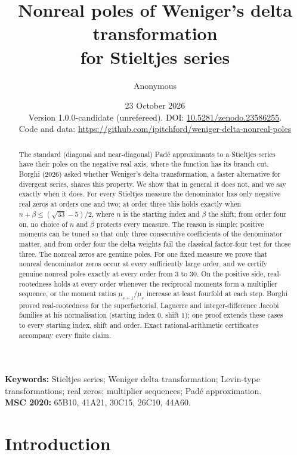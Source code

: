 \documentclass[11pt,a4paper]{article}
\title{Nonreal poles of Weniger's delta transformation\\ for Stieltjes series}
\author{Anonymous}
\date{23 October 2026\\[2pt]\small Version 1.0.0-candidate (unrefereed). DOI: \href{https://doi.org/10.5281/zenodo.23586255}{10.5281/zenodo.23586255}.\\
\small Code and data: \url{https://github.com/ipitchford/weniger-delta-nonreal-poles}}
\theoremstyle{definition}
\theoremstyle{remark}
\begin{document}
\maketitle

\begin{abstract}
The standard (diagonal and near-diagonal) Padé approximants to a Stieltjes
series have their poles on the negative real axis, where the function has its branch cut. Borghi (2026)
asked whether Weniger's delta transformation, a faster alternative for
divergent series, shares this property. We show that in general it does
not, and we say exactly when it does. For every Stieltjes measure the
denominator has only negative real zeros at orders one and two; at order
three this holds exactly when $n+\beta\le(\sqrt{33}-5)/2$, where $n$ is the
starting index and $\beta$ the shift; from order four on, no choice of
$n$ and $\beta$ protects every measure. The reason is simple: positive
moments can be tuned so that only three consecutive coefficients of the
denominator matter, and from order four the delta weights fail the
classical factor-four test for those three. The nonreal zeros are genuine
poles. For one fixed measure we prove that nonreal denominator zeros occur
at every sufficiently large order, and we certify genuine nonreal poles
exactly at every order from 3 to 30. On the positive side, real-rootedness
holds at every order whenever the reciprocal moments form a multiplier
sequence, or the moment ratios $\mu_{r+1}/\mu_r$ increase at least
fourfold at each step. Borghi proved real-rootedness for the
superfactorial, Laguerre and integer-difference Jacobi families at his
normalisation (starting index $0$, shift $1$); one proof extends these
cases to every starting index, shift and order. Exact rational-arithmetic
certificates accompany every finite claim.
\end{abstract}

\noindent\textbf{Keywords:} Stieltjes series; Weniger delta transformation;
Levin-type transformations; real zeros; multiplier sequences; Padé
approximation.\\
\textbf{MSC 2020:} 65B10, 41A21, 30C15, 26C10, 44A60.

\section{Introduction}\label{sec:intro}
\end{document}
